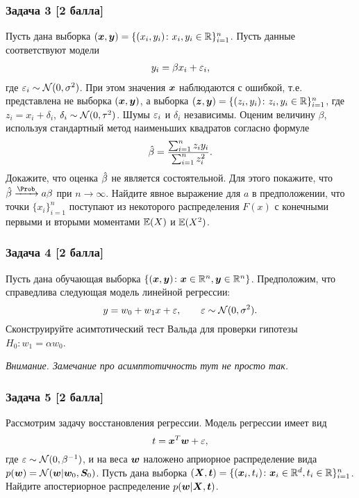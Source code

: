 \documentclass{article}
\theoremstyle{plain}
\begin{document}
\subsubsection*{Задача 3 [2 балла]}
Пусть дана выборка $(\boldsymbol{x}, \boldsymbol{y}) = \{(x_i,y_i)\colon x_i, y_i \in \mathbb{R}\}_{i=1}^n$. Пусть данные соответствуют модели
\begin{gather*}
	y_i = \beta x_i + \varepsilon_i,
\end{gather*}
где $\varepsilon_i \sim \mathcal{N}(0, \sigma^2)$. При этом значения $\boldsymbol{x}$ наблюдаются с ошибкой, т.е. представлена не выборка $(\boldsymbol{x}, \boldsymbol{y})$, а выборка $(\boldsymbol{z}, \boldsymbol{y}) = \{(z_i, y_i)\colon z_i, y_i \in \mathbb{R}\}_{i = 1}^n$, где $z_i = x_i + \delta_i$, $\delta_i \sim \mathcal{N}(0, \tau^2)$. Шумы $\varepsilon_i$ и $\delta_i$ независимы. Оценим величину $\beta$, используя стандартный метод наименьших квадратов согласно формуле
\begin{gather*}
	\hat{\beta} = \frac{\sum_{i=1}^n z_i y_i}{\sum_{i=1}^n z_i^2}.
\end{gather*}
Докажите, что оценка $\hat{\beta}$ не является состоятельной. Для этого покажите, что $\hatbeta \xrightarrow[]{\Prob} a\beta$ при $n \to \infty$. Найдите явное выражение для $a$ в предположении, что точки $\{x_i\}_{i=1}^n$ поступают из некоторого распределения $F(x)$ с конечными первыми и вторыми моментами $\mathbb{E}(X)$ и $\mathbb{E}(X^2)$. 

\subsubsection*{Задача 4 [2 балла]}
Пусть дана обучающая выборка $\{(\boldsymbol{x}, \boldsymbol{y}) \colon \boldsymbol{x} \in \mathbb{R}^{n}, \boldsymbol{y} \in \mathbb{R}^{n} \}$. Предположим, что справедлива следующая модель линейной регрессии:
$$
y = w_0 + w_1 x + \varepsilon,\qquad \varepsilon \sim \mathcal{N}(0, \sigma^2).
$$
Сконструируйте асимтотический тест Вальда для проверки гипотезы $H_0 \colon w_1 = \alpha w_0$.

\textit{Внимание. Замечание про асимптотичность тут не просто так.}

\subsubsection*{Задача 5 [2 балла]}
Рассмотрим задачу восстановления регрессии. Модель регрессии имеет вид
$$
t = \boldsymbol{x}^T\boldsymbol{w} + \varepsilon,
$$ 
где $\varepsilon \sim \mathcal{N}(0,\beta^{-1})$, и на веса $\boldsymbol{w}$ наложено априорное распределение вида $p(\boldsymbol{w}) = \mathcal{N}(\boldsymbol{w}|\boldsymbol{w}_0,\boldsymbol{S}_0)$. 
Пусть дана выборка $(\boldsymbol{X}, \boldsymbol{t}) = \{(\boldsymbol{x}_i, t_i)\colon \boldsymbol{x}_i \in \mathbb{R}^d, t_i \in \mathbb{R}\}_{i=1}^n$. Найдите апостериорное распределение $p(\boldsymbol{w}|\boldsymbol{X}, \boldsymbol{t})$.
\end{document}
